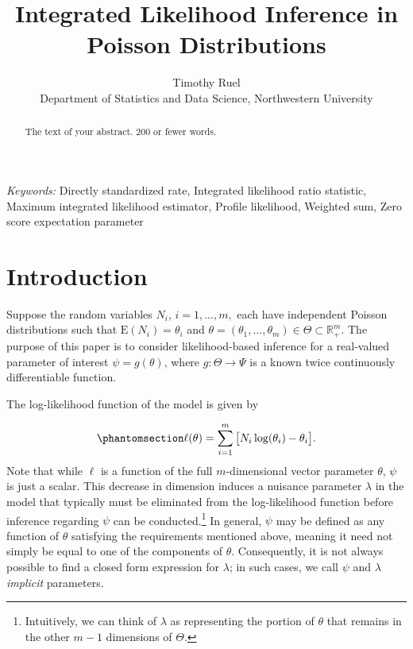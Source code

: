 \documentclass[
  12pt]{article}
\begin{document}
\def\spacingset#1{\renewcommand{\baselinestretch}%
{#1}\small\normalsize} \spacingset{1}



\title{\bf Integrated Likelihood Inference in Poisson Distributions}
\author{
Timothy Ruel\\
Department of Statistics and Data Science, Northwestern University\\
}
\maketitle

\bigskip
\bigskip
\begin{abstract}
The text of your abstract. 200 or fewer words.
\end{abstract}

\noindent%
{\it Keywords:} Directly standardized rate, Integrated likelihood ratio
statistic, Maximum integrated likelihood estimator, Profile
likelihood, Weighted sum, Zero score expectation parameter
\vfill

\newpage
\spacingset{1.9} %

\section{Introduction}\label{sec-intro}

Suppose the random variables \(N_i\), \(i = 1, ..., m,\) each have
independent Poisson distributions such that \(\text{E}(N_i) = \theta_i\)
and
\(\theta = (\theta_1, ..., \theta_m) \in \Theta \subset \mathbb{R}^m_+\).
The purpose of this paper is to consider likelihood-based inference for
a real-valued parameter of interest \(\psi = g(\theta)\), where
\(g: \Theta \to \Psi\) is a known twice continuously differentiable
function.

The log-likelihood function of the model is given by

\begin{equation}\phantomsection\label{eq-1}{
\ell(\theta) = \sum_{i=1}^m \big[N_i \log(\theta_i) - \theta_i\big].
}\end{equation} Note that while \(\ell\) is a function of the full
\(m\)-dimensional vector parameter \(\theta\), \(\psi\) is just a
scalar. This decrease in dimension induces a nuisance parameter
\(\lambda\) in the model that typically must be eliminated from the
log-likelihood function before inference regarding \(\psi\) can be
conducted.\footnote{Intuitively, we can think of \(\lambda\) as
  representing the portion of \(\theta\) that remains in the other
  \(m-1\) dimensions of \(\Theta\).} In general, \(\psi\) may be defined
as any function of \(\theta\) satisfying the requirements mentioned
above, meaning it need not simply be equal to one of the components of
\(\theta\). Consequently, it is not always possible to find a closed
form expression for \(\lambda\); in such cases, we call \(\psi\) and
\(\lambda\) \emph{implicit} parameters.
\end{document}
